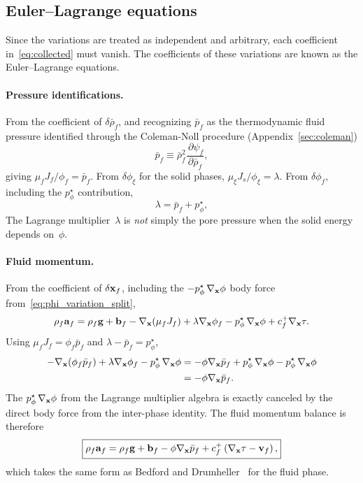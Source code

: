\documentclass[11pt]{article}
\begin{document}
\subsection{Euler--Lagrange equations}

Since the variations are treated as independent and arbitrary, each coefficient in~\eqref{eq:collected} must vanish.  The coefficients of these variations are known as the Euler--Lagrange equations.

\paragraph{Pressure identifications.}  From the coefficient of $\delta\bar\rho_f$, and recognizing $\bar{p}_f$ as the thermodynamic fluid pressure identified through the Coleman-Noll procedure (Appendix~\ref{sec:coleman})
%
\begin{equation*}
  \bar{p}_f \equiv \bar{\rho}_f^2\frac{\,\partial\psi_f}{\partial\bar\rho_f},
\end{equation*}
%
giving $\mu_f J_f / \phi_f = \bar{p}_f$.  From $\delta\phi_\xi$ for the solid phases, $\mu_\xi J_s / \phi_\xi = \lambda$.  From $\delta\phi_f$, including the $p^\star_\phi$ contribution,
\begin{equation}
  \boxed{\lambda = \bar{p}_f + p^\star_\phi,}
  \label{eq:lambda_full}
\end{equation}
The Lagrange multiplier~$\lambda$ is \emph{not} simply the pore pressure when the solid energy depends on~$\phi$.

\paragraph{Fluid momentum.}  From the coefficient of $\delta\mathbf{x}_f$, including the $-p^\star_\phi\,\nabla_{\mathbf{x}}\phi$ body force from~\eqref{eq:phi_variation_split},
\begin{equation*}
  \rho_f\mathbf{a}_f = \rho_f\mathbf{g} + \mathbf{b}_f - \nabla_{\mathbf{x}}(\mu_f J_f) + \lambda\nabla_{\mathbf{x}}\phi_f - p^\star_\phi\,\nabla_{\mathbf{x}}\phi + c^+_f\nabla_{\mathbf{x}}\tau.
\end{equation*}
Using $\mu_f J_f = \phi_f \bar{p}_f$ and $\lambda - \bar{p}_f = p^\star_\phi$,
\begin{align*}
  -\nabla_{\mathbf{x}}(\phi_f \bar{p}_f) + \lambda\nabla_{\mathbf{x}}\phi_f - p^\star_\phi\,\nabla_{\mathbf{x}}\phi
  &= -\phi\nabla_{\mathbf{x}}\bar{p}_f + p^\star_\phi\,\nabla_{\mathbf{x}}\phi - p^\star_\phi\,\nabla_{\mathbf{x}}\phi \\
  &= -\phi\nabla_{\mathbf{x}}\bar{p}_f.
\end{align*}
The $p^\star_\phi\,\nabla_{\mathbf{x}}\phi$ from the Lagrange multiplier algebra is exactly canceled by the direct body force from the inter-phase identity.  The fluid momentum balance is therefore
\begin{equation*}
  \boxed{\rho_f\mathbf{a}_f = \rho_f\mathbf{g} + \mathbf{b}_f - \phi\nabla_{\mathbf{x}}\bar{p}_f + c^+_f\left(\nabla_{\mathbf{x}}\tau - \mathbf{v}_f\right),}
\end{equation*}
which takes the same form as Bedford and Drumheller~\cite{drumheller1980thermomechanical} for the fluid phase.
\end{document}
